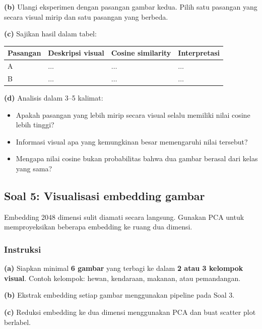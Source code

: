 \documentclass[12pt, a4paper]{article}
\begin{document}
\textbf{(b)} Ulangi eksperimen dengan pasangan gambar kedua. Pilih satu pasangan yang secara visual mirip dan satu pasangan yang berbeda.

\textbf{(c)} Sajikan hasil dalam tabel:

\begin{center}\small
\begin{tabular}{@{} L{2cm} L{4.5cm} C{2.2cm} L{3.5cm} @{}}
  \toprule \textbf{Pasangan} & \textbf{Deskripsi visual} & \textbf{Cosine similarity} & \textbf{Interpretasi} \\
  \midrule
  A & $\ldots$ & $\ldots$ & $\ldots$ \\
  B & $\ldots$ & $\ldots$ & $\ldots$ \\
  \bottomrule
\end{tabular}
\end{center}

\textbf{(d)} Analisis dalam 3--5 kalimat:
\begin{itemize}
  \item Apakah pasangan yang lebih mirip secara visual selalu memiliki nilai cosine lebih tinggi?
  \item Informasi visual apa yang kemungkinan besar memengaruhi nilai tersebut?
  \item Mengapa nilai cosine bukan probabilitas bahwa dua gambar berasal dari kelas yang sama?
\end{itemize}

\clearpage
\subsection{Soal 5: Visualisasi embedding gambar}
\label{sec:soal4-visual}

Embedding 2048 dimensi sulit diamati secara langsung. Gunakan PCA untuk memproyeksikan beberapa embedding ke ruang dua dimensi.

\subsubsection{Instruksi}
\label{sec:soal4-instruksi}

\textbf{(a)} Siapkan minimal \textbf{6 gambar} yang terbagi ke dalam \textbf{2 atau 3 kelompok visual}. Contoh kelompok: hewan, kendaraan, makanan, atau pemandangan.

\textbf{(b)} Ekstrak embedding setiap gambar menggunakan pipeline pada Soal 3.

\textbf{(c)} Reduksi embedding ke dua dimensi menggunakan PCA dan buat scatter plot berlabel.
\end{document}
